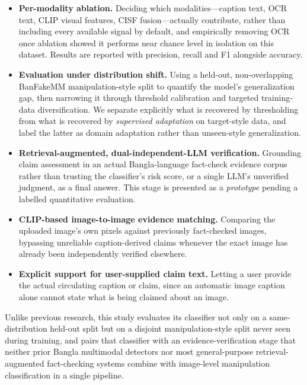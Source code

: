 \documentclass[conference,a4paper]{IEEEtran}
\begin{document}
\begin{itemize}
\item \textbf{Per-modality ablation.} Deciding which modalities---caption
text, OCR text, CLIP visual features, CISF fusion---actually contribute,
rather than including every available signal by default, and empirically
removing OCR once ablation showed it performs near chance level in isolation
on this dataset. Results are reported with precision, recall and F1 alongside
accuracy.

\item \textbf{Evaluation under distribution shift.} Using a held-out,
non-overlapping BanFakeMM manipulation-style split to quantify the model's
generalization gap, then narrowing it through threshold calibration and
targeted training-data diversification. We separate explicitly what is
recovered by thresholding from what is recovered by \emph{supervised
adaptation} on target-style data, and label the latter as domain adaptation
rather than unseen-style generalization.

\item \textbf{Retrieval-augmented, dual-independent-LLM verification.}
Grounding claim assessment in an actual Bangla-language fact-check evidence
corpus rather than trusting the classifier's risk score, or a single LLM's
unverified judgment, as a final answer. This stage is presented as a
\emph{prototype} pending a labelled quantitative evaluation.

\item \textbf{CLIP-based image-to-image evidence matching.} Comparing the
uploaded image's own pixels against previously fact-checked images, bypassing
unreliable caption-derived claims whenever the exact image has already been
independently verified elsewhere.

\item \textbf{Explicit support for user-supplied claim text.} Letting a user
provide the actual circulating caption or claim, since an automatic image
caption alone cannot state what is being claimed about an image.
\end{itemize}

Unlike previous research, this study evaluates its classifier not only on a
same-distribution held-out split but on a disjoint manipulation-style split
never seen during training, and pairs that classifier with an
evidence-verification stage that neither prior Bangla multimodal detectors nor
most general-purpose retrieval-augmented fact-checking systems combine with
image-level manipulation classification in a single pipeline.
\end{document}
